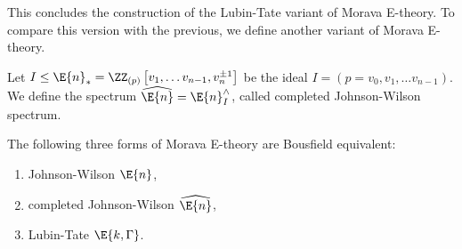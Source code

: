 This concludes the construction of the Lubin-Tate variant of Morava E-theory.
To compare this version with the previous, we define another variant of Morava E-theory.

\begin{definition}
	Let $I \leq \E{n}_* = \ZZ_{\left(p\right)}\left[v_1, \dotsc v_{n-1}, v_n^{\pm 1}\right]$ be the ideal $I = \left(p = v_0, v_1, \dotsc v_{n-1}\right)$.
	We define the spectrum $\widehat{\E{n}} = \E{n}_I^\wedge$, called completed Johnson-Wilson spectrum.
\end{definition}

\begin{theorem}
	The following three forms of Morava E-theory are Bousfield equivalent:
	\begin{enumerate}
		\item Johnson-Wilson $\E{n}$,
		\item completed Johnson-Wilson $\widehat{\E{n}}$,
		\item Lubin-Tate $\E{k, \Gamma}$.
	\end{enumerate}
\end{theorem}
